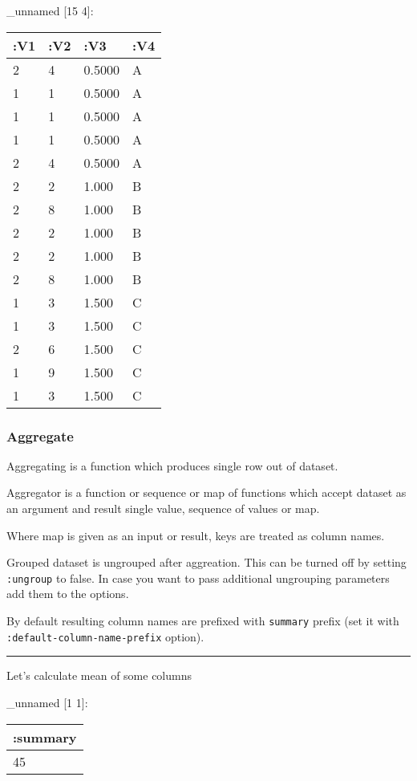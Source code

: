 \documentclass[]{article}
\newenvironment{Shaded}{\begin{snugshade}}{\end{snugshade}}
\newcommand{\KeywordTok}[1]{\textcolor[rgb]{0.13,0.29,0.53}{\textbf{#1}}}
\newcommand{\VariableTok}[1]{\textcolor[rgb]{0.00,0.00,0.00}{#1}}
\newcommand{\AttributeTok}[1]{\textcolor[rgb]{0.77,0.63,0.00}{#1}}
\newcommand{\NormalTok}[1]{#1}
\begin{document}
\_unnamed {[}15 4{]}:

\begin{longtable}[]{@{}llll@{}}
\toprule
:V1 & :V2 & :V3 & :V4\tabularnewline
\midrule
\endhead
2 & 4 & 0.5000 & A\tabularnewline
1 & 1 & 0.5000 & A\tabularnewline
1 & 1 & 0.5000 & A\tabularnewline
1 & 1 & 0.5000 & A\tabularnewline
2 & 4 & 0.5000 & A\tabularnewline
2 & 2 & 1.000 & B\tabularnewline
2 & 8 & 1.000 & B\tabularnewline
2 & 2 & 1.000 & B\tabularnewline
2 & 2 & 1.000 & B\tabularnewline
2 & 8 & 1.000 & B\tabularnewline
1 & 3 & 1.500 & C\tabularnewline
1 & 3 & 1.500 & C\tabularnewline
2 & 6 & 1.500 & C\tabularnewline
1 & 9 & 1.500 & C\tabularnewline
1 & 3 & 1.500 & C\tabularnewline
\bottomrule
\end{longtable}

\subsubsection{Aggregate}\label{aggregate}

Aggregating is a function which produces single row out of dataset.

Aggregator is a function or sequence or map of functions which accept
dataset as an argument and result single value, sequence of values or
map.

Where map is given as an input or result, keys are treated as column
names.

Grouped dataset is ungrouped after aggreation. This can be turned off by
setting \texttt{:ungroup} to false. In case you want to pass additional
ungrouping parameters add them to the options.

By default resulting column names are prefixed with \texttt{summary}
prefix (set it with \texttt{:default-column-name-prefix} option).

\begin{center}\rule{0.5\linewidth}{0.5pt}\end{center}

Let's calculate mean of some columns

\begin{Shaded}
\end{Shaded}

\_unnamed {[}1 1{]}:

\begin{longtable}[]{@{}l@{}}
\toprule
:summary\tabularnewline
\midrule
\endhead
45\tabularnewline
\bottomrule
\end{longtable}
\end{document}

